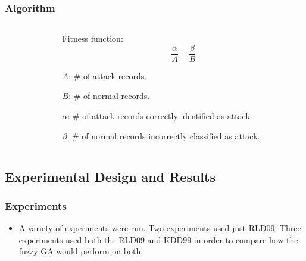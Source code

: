 \documentclass{beamer}
\begin{document}
\begin{frame}
	\frametitle{Algorithm}
\begin{columns}
\begin{column}{0.6\textwidth}
\begin{small}
\begin{algorithmic}
    \ENDFOR    
      \ELSE {}
    \ENDIF
  \ENDFOR
  \STATE{find $A$, $B$, $\alpha$, and $\beta$  %
  
  } 
\ENDFOR
{}

\end{algorithmic}
\end{small}
\end{column}

\begin{column}{0.4\textwidth}
	Fitness function:
	\begin{equation*}
	\frac{\alpha}{A} - \frac{\beta}{B}
	\end{equation*}

	$A$: \# of attack records.
	
	$B$: \# of normal records. 

	$\alpha$: \# of attack records correctly identified as attack.

	$\beta$: \# of normal records incorrectly classified as attack.
	
\end{column}
\end{columns}
\end{frame}


\subsection{Experimental Design and Results}

\begin{frame}
	\frametitle{Experiments}
	\begin{itemize}
		\item A variety of experiments were run. Two experiments used just RLD09. Three experiments used both the RLD09 and KDD99 in order to compare how the fuzzy GA would perform on both.
	\end{itemize}
\end{frame}
\end{document}
